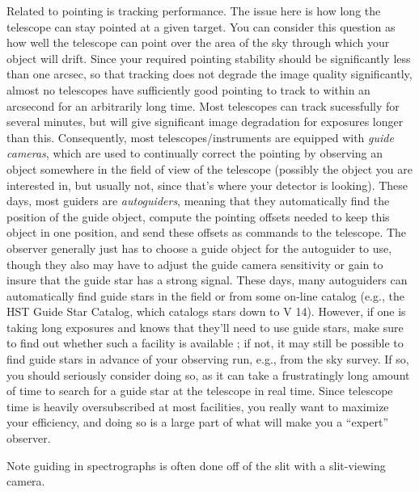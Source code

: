 \documentclass[12pt]{article}
\begin{document}
Related to pointing is tracking performance. The issue here is how long the
telescope can stay pointed at a given target. You can consider this question as
how well the telescope can point over the area of the sky through which your
object will drift. Since your required pointing stability should be
significantly less than one arcsec, so that tracking does not degrade the image
quality significantly, almost no telescopes have sufficiently good pointing to
track to within an arcsecond for an arbitrarily long time. Most telescopes can
track sucessfully for several minutes, but will give significant image
degradation for exposures longer than this. Consequently, most
telescopes/instruments are equipped with \textit{guide cameras}, which are used
to continually correct the pointing by observing an object somewhere in the
field of view of the telescope (possibly the object you are interested in, but
usually not, since that's where your detector is looking). These days, most
guiders are \textit{autoguiders}, meaning that they automatically find the
position of the guide object, compute the pointing offsets needed to keep this
object in one position, and send these offsets as commands to the telescope.
The observer generally just has to choose a guide object for the autoguider to
use, though they also may have to adjust the guide camera sensitivity or gain
to insure that the guide star has a strong signal. These days, many autoguiders
can automatically find guide stars in the field or from some on-line catalog
(e.g., the HST Guide Star Catalog, which catalogs stars down to V 14). However,
if one is taking long exposures and knows that they'll need to use guide stars,
make sure to find out whether such a facility is available ; if not, it may
still be possible to find guide stars in advance of your observing run, e.g.,
from the sky survey. If so, you should seriously consider doing so, as it can
take a frustratingly long amount of time to search for a guide star at the
telescope in real time. Since telescope time is heavily oversubscribed at most
facilities, you really want to maximize your efficiency, and doing so is a
large part of what will make you a ``expert'' observer.

Note guiding in spectrographs is often done off of the slit with a
slit-viewing camera.
\end{document}
